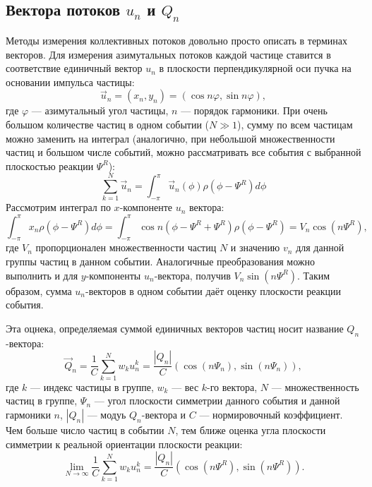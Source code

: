 \subsection{Вектора потоков $u_n$ и $Q_n$}

Методы измерения коллективных потоков довольно просто описать в терминах векторов.
Для измерения азимутальных потоков каждой частице ставится в соответствие единичный вектор $u_n$ в плоскости перпендикулярной оси пучка на основании импульса частицы:
%
\begin{equation}
    \vec{u}_n = (x_n, y_n) = ( \cos n \varphi, \sin n \varphi ),
\end{equation}
%
где $\varphi$ --- азимутальный угол частицы, $n$ --- порядок гармоники. 
При очень большом количестве частиц в одном событии ($N \gg 1$), сумму по всем частицам можно заменить на интеграл (аналогично, при небольшой множественности частиц и большом числе событий, можно рассматривать все события с выбранной плоскостью реакции $\Psi^R$):
%
\begin{equation}
    \sum_{k=1}^{N} \vec{u}_n = \int_{-\pi}^{\pi} \vec{u}_n(\phi) \rho(\phi-\Psi^R) d\phi
\end{equation}
Рассмотрим интеграл по $x$-компоненте $u_n$ вектора:
%
\begin{equation}
    \int_{-\pi}^{\pi} x_n \rho(\phi-\Psi^R) d\phi =
    \int_{-\pi}^{\pi} \cos n ( \phi - \Psi^R + \Psi^R ) \rho(\phi - \Psi^R) = V_n \cos (n\Psi^R), 
\end{equation}
где $V_n$ пропорционален множественности частиц $N$ и значению $v_n$ для данной группы частиц в данном событии.
Аналогичные преобразования можно выполнить и для $y$-компоненты $u_n$-вектора, получив $V_n\sin(n\Psi^R)$.
Таким образом, сумма $u_n$-векторов в одном событии даёт оценку плоскости реакции события.

Эта оцнека, определяемая суммой единичных векторов частиц носит название $Q_n$-вектора:
%
\begin{equation}
    \vec{Q}_n = \frac{1}{C} \sum_{k=1}^{N} w_k u_n^k = \frac{|Q_n|}{C} (\cos{(n\Psi_n)}, \sin{(n\Psi_n)}),
\end{equation}
%
где $k$ --- индекс частицы в группе, $w_k$ --- вес $k$-го вектора, $N$ --- множественность частиц в группе, $\Psi_n$ --- угол плоскости симметрии данного события и данной гармоники $n$, $|Q_n|$ --- модуь $Q_n$-вектора и $C$ --- нормировочный коэффициент. 
Чем больше число частиц в событии $N$, тем ближе оценка угла плоскости симметрии к реальной ориентации плоскости реакции:
%
\begin{equation}
    \lim_{N \xrightarrow{} \infty} \frac{1}{C} \sum_{k=1}^{N} w_k u_n^k = \frac{|Q_n|}{C} (\cos (n\Psi^R), \sin (n\Psi^R) ) .
\end{equation}


